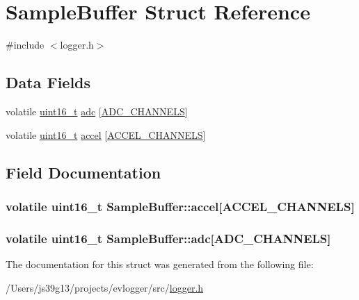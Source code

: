 \hypertarget{structSampleBuffer}{\section{Sample\-Buffer Struct Reference}
\label{structSampleBuffer}
}


{\ttfamily \#include $<$logger.\-h$>$}

\subsection*{Data Fields}
\begin{DoxyCompactItemize}
\item 
volatile \hyperlink{typedefs_8h_a1f1825b69244eb3ad2c7165ddc99c956}{uint16\-\_\-t} \hyperlink{structSampleBuffer_a3d99620683fe3563724b2914f022568d}{adc} \mbox{[}\hyperlink{logger_8h_a065dcfa648ca52ed6214008cb177de36}{A\-D\-C\-\_\-\-C\-H\-A\-N\-N\-E\-L\-S}\mbox{]}
\item 
volatile \hyperlink{typedefs_8h_a1f1825b69244eb3ad2c7165ddc99c956}{uint16\-\_\-t} \hyperlink{structSampleBuffer_a9a64a06367799bad845e62d42b473269}{accel} \mbox{[}\hyperlink{logger_8h_a97ed3fe57790c99c8e351a42713c604d}{A\-C\-C\-E\-L\-\_\-\-C\-H\-A\-N\-N\-E\-L\-S}\mbox{]}
\end{DoxyCompactItemize}


\subsection{Field Documentation}
\hypertarget{structSampleBuffer_a9a64a06367799bad845e62d42b473269}{
\subsubsection[{accel}]{\setlength{\rightskip}{0pt plus 5cm}volatile {\bf uint16\-\_\-t} Sample\-Buffer\-::accel\mbox{[}{\bf A\-C\-C\-E\-L\-\_\-\-C\-H\-A\-N\-N\-E\-L\-S}\mbox{]}}}\label{structSampleBuffer_a9a64a06367799bad845e62d42b473269}
\hypertarget{structSampleBuffer_a3d99620683fe3563724b2914f022568d}{
\subsubsection[{adc}]{\setlength{\rightskip}{0pt plus 5cm}volatile {\bf uint16\-\_\-t} Sample\-Buffer\-::adc\mbox{[}{\bf A\-D\-C\-\_\-\-C\-H\-A\-N\-N\-E\-L\-S}\mbox{]}}}\label{structSampleBuffer_a3d99620683fe3563724b2914f022568d}


The documentation for this struct was generated from the following file\-:\begin{DoxyCompactItemize}
\item 
/\-Users/js39g13/projects/evlogger/src/\hyperlink{logger_8h}{logger.\-h}\end{DoxyCompactItemize}
